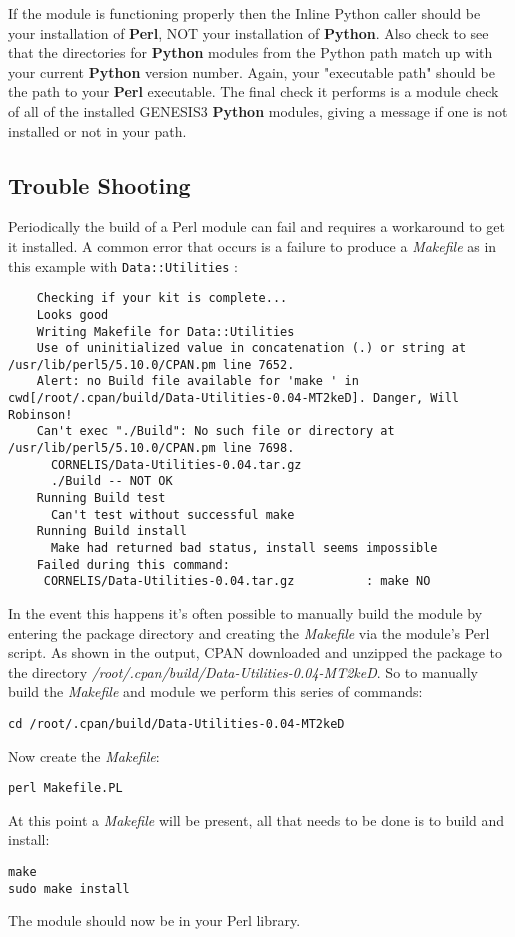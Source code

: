 \documentclass[12pt]{article}
\begin{document}
If the module is functioning properly then the Inline Python caller should be your installation of {\bf Perl}, NOT your installation of {\bf Python}. Also check to see that the directories for {\bf Python} modules from the Python path match up with your current {\bf Python} version number. Again, your "executable path" should be the path to your {\bf Perl} executable. The final check it performs is a module check of all of the installed GENESIS3 {\bf Python} modules, giving a message if one is not installed or not in your path. 

\subsection*{Trouble Shooting}

Periodically the build of a Perl module can fail and requires a workaround to get it installed. A common error that occurs is a failure to produce a {\it Makefile} as in this example with {\tt Data::Utilities} :

\begin{verbatim}
	Checking if your kit is complete...
	Looks good
	Writing Makefile for Data::Utilities
	Use of uninitialized value in concatenation (.) or string at /usr/lib/perl5/5.10.0/CPAN.pm line 7652.
	Alert: no Build file available for 'make ' in cwd[/root/.cpan/build/Data-Utilities-0.04-MT2keD]. Danger, Will Robinson!
	Can't exec "./Build": No such file or directory at /usr/lib/perl5/5.10.0/CPAN.pm line 7698.
	  CORNELIS/Data-Utilities-0.04.tar.gz
	  ./Build -- NOT OK
	Running Build test
	  Can't test without successful make
	Running Build install
	  Make had returned bad status, install seems impossible
	Failed during this command:
	 CORNELIS/Data-Utilities-0.04.tar.gz          : make NO
\end{verbatim} 

In the event this happens it's often possible to manually build the module by entering the package directory and creating the {\it Makefile} via the module's Perl script. As shown in the output, CPAN downloaded and unzipped the package to the directory {\it /root/.cpan/build/Data-Utilities-0.04-MT2keD}. So to manually build the {\it Makefile} and module we perform this series of commands:

\begin{verbatim}
cd /root/.cpan/build/Data-Utilities-0.04-MT2keD
\end{verbatim}

Now create the {\it Makefile}:

\begin{verbatim}
perl Makefile.PL
\end{verbatim}

At this point a {\it Makefile} will be present, all that needs to be done is to build and install:

\begin{verbatim}
make
sudo make install
\end{verbatim}

The module should now be in your Perl library. 
\end{document}
